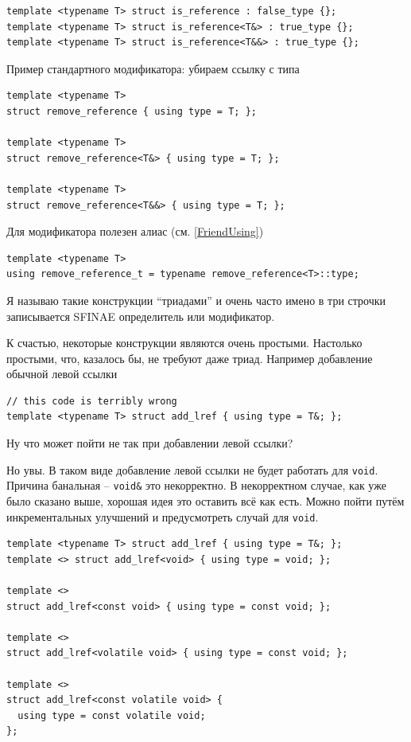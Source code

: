 \documentclass[a4paper,12pt,oneside]{book}
\begin{document}
\begin{lstlisting}
template <typename T> struct is_reference : false_type {};
template <typename T> struct is_reference<T&> : true_type {};
template <typename T> struct is_reference<T&&> : true_type {};
\end{lstlisting}

Пример стандартного модификатора: убираем ссылку с типа

\begin{lstlisting}
template <typename T> 
struct remove_reference { using type = T; };

template <typename T> 
struct remove_reference<T&> { using type = T; };

template <typename T> 
struct remove_reference<T&&> { using type = T; };
\end{lstlisting}

Для модификатора полезен алиас (см. \ref{FriendUsing})

\begin{lstlisting}
template <typename T> 
using remove_reference_t = typename remove_reference<T>::type;
\end{lstlisting}

Я называю такие конструкции ``триадами'' и очень часто имено в три строчки записывается SFINAE определитель или модификатор.

К счастью, некоторые конструкции являются очень простыми. Настолько простыми, что, казалось бы, не требуют даже триад. Например добавление обычной левой ссылки

\begin{lstlisting}
// this code is terribly wrong
template <typename T> struct add_lref { using type = T&; };
\end{lstlisting}

Ну что может пойти не так при добавлении левой ссылки?

Но увы. В таком виде добавление левой ссылки не будет работать для \lstinline!void!. Причина банальная -- \lstinline!void&! это некорректно. В некорректном случае, как уже было сказано выше, хорошая идея это оставить всё как есть. Можно пойти путём инкрементальных улучшений и предусмотреть случай для \lstinline!void!.

\begin{lstlisting}
template <typename T> struct add_lref { using type = T&; };
template <> struct add_lref<void> { using type = void; };

template <> 
struct add_lref<const void> { using type = const void; };

template <> 
struct add_lref<volatile void> { using type = const void; };

template <> 
struct add_lref<const volatile void> { 
  using type = const volatile void; 
};
\end{lstlisting}
\end{document}

